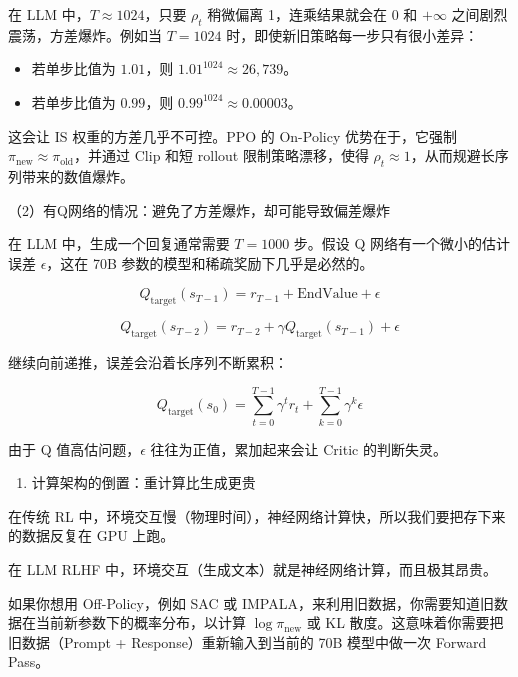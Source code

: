 在 LLM 中，\(T\approx1024\)，只要 \(\rho_t\) 稍微偏离 1，连乘结果就会在 0 和 \(+\infty\) 之间剧烈震荡，方差爆炸。例如当 \(T=1024\) 时，即使新旧策略每一步只有很小差异：

\begin{itemize}
\tightlist
\item
  若单步比值为 \(1.01\)，则 \(1.01^{1024}\approx 26,739\)。
\item
  若单步比值为 \(0.99\)，则 \(0.99^{1024}\approx 0.00003\)。
\end{itemize}

这会让 IS 权重的方差几乎不可控。PPO 的 On-Policy 优势在于，它强制 \(\pi_{\mathrm{new}}\approx\pi_{\mathrm{old}}\)，并通过 Clip 和短 rollout 限制策略漂移，使得 \(\rho_t\approx1\)，从而规避长序列带来的数值爆炸。

（2）有Q网络的情况：避免了方差爆炸，却可能导致偏差爆炸

在 LLM 中，生成一个回复通常需要 \(T=1000\) 步。假设 Q 网络有一个微小的估计误差 \(\epsilon\)，这在 70B 参数的模型和稀疏奖励下几乎是必然的。

\[
Q_{\mathrm{target}}(s_{T-1})
=
r_{T-1}
+\mathrm{EndValue}
+\epsilon
\]

\[
Q_{\mathrm{target}}(s_{T-2})
=
r_{T-2}
+\gamma Q_{\mathrm{target}}(s_{T-1})
+\epsilon
\]

继续向前递推，误差会沿着长序列不断累积：

\[
Q_{\mathrm{target}}(s_0)
=
\sum_{t=0}^{T-1}\gamma^t r_t
+
\sum_{k=0}^{T-1}\gamma^k \epsilon
\]

由于 Q 值高估问题，\(\epsilon\) 往往为正值，累加起来会让 Critic 的判断失灵。

\begin{enumerate}
\def\labelenumi{\arabic{enumi}.}
\setcounter{enumi}{1}
\tightlist
\item
  计算架构的倒置：重计算比生成更贵
\end{enumerate}

在传统 RL 中，环境交互慢（物理时间），神经网络计算快，所以我们要把存下来的数据反复在 GPU 上跑。

在 LLM RLHF 中，环境交互（生成文本）就是神经网络计算，而且极其昂贵。

如果你想用 Off-Policy，例如 SAC 或 IMPALA，来利用旧数据，你需要知道旧数据在当前新参数下的概率分布，以计算 \(\log\pi_{\mathrm{new}}\) 或 KL 散度。这意味着你需要把旧数据（Prompt + Response）重新输入到当前的 70B 模型中做一次 Forward Pass。

